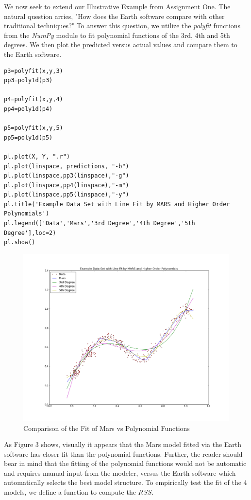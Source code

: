 We now seek to extend our Illustrative Example from Assignment One. The natural question arries, "How does the Earth software compare with other traditional techniques?" To answer this question, we utilize the \emph{polyfit} functions from the \emph{NumPy} module to fit polynomial functions of the 3rd, 4th and 5th degrees. We then plot the predicted versus actual values and compare them to the Earth software.

\begin{lstlisting}[caption={Fit Polynomial Functions of the 3rd, 4th and 5th Degrees.  },label=lst:expected_times,firstnumber=43]
p3=polyfit(x,y,3)
pp3=poly1d(p3)

p4=polyfit(x,y,4)
pp4=poly1d(p4)

p5=polyfit(x,y,5)
pp5=poly1d(p5)

pl.plot(X, Y, ".r")
pl.plot(linspace, predictions, "-b")
pl.plot(linspace,pp3(linspace),"-g")
pl.plot(linspace,pp4(linspace),"-m")
pl.plot(linspace,pp5(linspace),"-y")
pl.title('Example Data Set with Line Fit by MARS and Higher Order Polynomials')
pl.legend(['Data','Mars','3rd Degree','4th Degree','5th Degree'],loc=2)
pl.show()
\end{lstlisting}
\begin{figure}[H]
    \centering
       \includegraphics[width=6.5in]{example_data_poly_fit.png}
    \caption{Comparison of the Fit of Mars vs Polynomial Functions}
    \label{Example Data}
\end{figure}

As Figure 3 shows, visually it appears that the Mars model fitted via the Earth software has closer fit than the polynomial functions. Further, the reader should bear in mind that the fitting of the polynomial functions would not be automatic and requires manual input from the modeler, versus the Earth software which automatically selects the best model structure. To empirically test the fit of the 4 models, we define a function to compute the $RSS$. 

